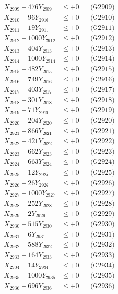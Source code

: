 \documentclass[a4paper,10pt]{article}
\begin{document}
{\begin{align}
X_{2909} - 476Y_{2909} &\leq +0 && \text{(G2909)} \\
X_{2910} - 96Y_{2910} &\leq +0 && \text{(G2910)} \\
\allowbreak
X_{2911} - 19Y_{2911} &\leq +0 && \text{(G2911)} \\
X_{2912} - 1000Y_{2912} &\leq +0 && \text{(G2912)} \\
X_{2913} - 404Y_{2913} &\leq +0 && \text{(G2913)} \\
X_{2914} - 1000Y_{2914} &\leq +0 && \text{(G2914)} \\
X_{2915} - 482Y_{2915} &\leq +0 && \text{(G2915)} \\
X_{2916} - 749Y_{2916} &\leq +0 && \text{(G2916)} \\
X_{2917} - 403Y_{2917} &\leq +0 && \text{(G2917)} \\
X_{2918} - 301Y_{2918} &\leq +0 && \text{(G2918)} \\
X_{2919} - 71Y_{2919} &\leq +0 && \text{(G2919)} \\
X_{2920} - 204Y_{2920} &\leq +0 && \text{(G2920)} \\
\allowbreak
X_{2921} - 866Y_{2921} &\leq +0 && \text{(G2921)} \\
X_{2922} - 421Y_{2922} &\leq +0 && \text{(G2922)} \\
X_{2923} - 662Y_{2923} &\leq +0 && \text{(G2923)} \\
X_{2924} - 663Y_{2924} &\leq +0 && \text{(G2924)} \\
X_{2925} - 12Y_{2925} &\leq +0 && \text{(G2925)} \\
X_{2926} - 26Y_{2926} &\leq +0 && \text{(G2926)} \\
X_{2927} - 1000Y_{2927} &\leq +0 && \text{(G2927)} \\
X_{2928} - 252Y_{2928} &\leq +0 && \text{(G2928)} \\
X_{2929} - 2Y_{2929} &\leq +0 && \text{(G2929)} \\
X_{2930} - 515Y_{2930} &\leq +0 && \text{(G2930)} \\
\allowbreak
X_{2931} - 6Y_{2931} &\leq +0 && \text{(G2931)} \\
X_{2932} - 588Y_{2932} &\leq +0 && \text{(G2932)} \\
X_{2933} - 164Y_{2933} &\leq +0 && \text{(G2933)} \\
X_{2934} - 14Y_{2934} &\leq +0 && \text{(G2934)} \\
X_{2935} - 1000Y_{2935} &\leq +0 && \text{(G2935)} \\
X_{2936} - 696Y_{2936} &\leq +0 && \text{(G2936)} \\

\end{align}}
\end{document}
